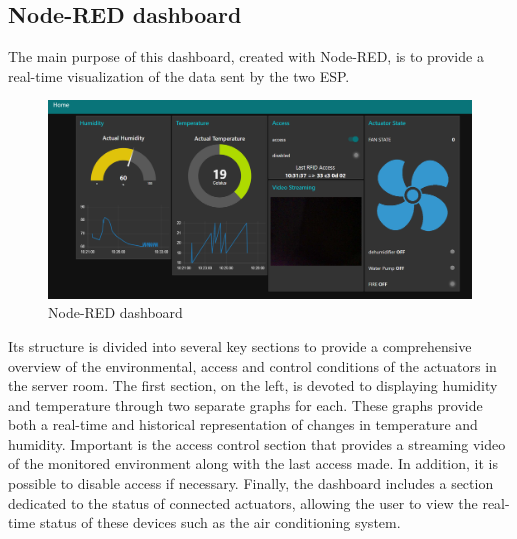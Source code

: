 \documentclass[]{scrartcl}
\begin{document}
\subsection{Node-RED dashboard}
The main purpose of this dashboard, created with Node-RED, is to provide a real-time visualization of the data sent by the two ESP.
\newpage
\begin{figure}[h]
	\centering
	\includegraphics[width=\textwidth]{node.red-dashboard.png}
	\caption{Node-RED dashboard}
\end{figure}
\noindent
Its structure is divided into several key sections to provide a comprehensive overview of the environmental, access and control conditions of the actuators in the server room.
\newline\newline
The first section, on the left, is devoted to displaying humidity and temperature through two separate graphs for each. These graphs provide both a real-time and historical representation of changes in temperature and humidity.
\newline\newline
Important is the access control section that provides a streaming video of the monitored environment along with the last access made. In addition, it is possible to disable access if necessary.
\newline\newline
Finally, the dashboard includes a section dedicated to the status of connected actuators, allowing the user to view the real-time status of these devices such as the air conditioning system.
\end{document}
